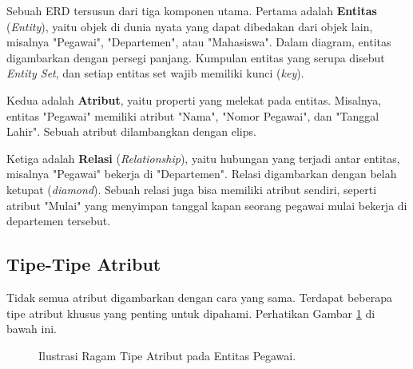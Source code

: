 \documentclass[11pt,a4paper]{article}
\begin{document}
Sebuah ERD tersusun dari tiga komponen utama. Pertama adalah \textbf{Entitas} (\textit{Entity}), yaitu objek di dunia nyata yang dapat dibedakan dari objek lain, misalnya "Pegawai", "Departemen", atau "Mahasiswa". Dalam diagram, entitas digambarkan dengan persegi panjang. Kumpulan entitas yang serupa disebut \textit{Entity Set}, dan setiap entitas set wajib memiliki kunci (\textit{key}).

Kedua adalah \textbf{Atribut}, yaitu properti yang melekat pada entitas. Misalnya, entitas "Pegawai" memiliki atribut "Nama", "Nomor Pegawai", dan "Tanggal Lahir". Sebuah atribut dilambangkan dengan elips.

Ketiga adalah \textbf{Relasi} (\textit{Relationship}), yaitu hubungan yang terjadi antar entitas, misalnya "Pegawai" bekerja di "Departemen". Relasi digambarkan dengan belah ketupat (\textit{diamond}). Sebuah relasi juga bisa memiliki atribut sendiri, seperti atribut "Mulai" yang menyimpan tanggal kapan seorang pegawai mulai bekerja di departemen tersebut.

\subsection{Tipe-Tipe Atribut}
Tidak semua atribut digambarkan dengan cara yang sama. Terdapat beberapa tipe atribut khusus yang penting untuk dipahami. Perhatikan Gambar \ref{fig:atribut} di bawah ini.

\begin{figure}[H]
	\centering
	\caption{Ilustrasi Ragam Tipe Atribut pada Entitas Pegawai.}
	\label{fig:atribut}
\end{figure}
\end{document}
